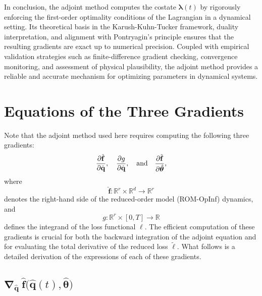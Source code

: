 In conclusion, the adjoint method computes the costate $\bm{\lambda}(t)$ by rigorously enforcing the first-order optimality conditions of the Lagrangian in a dynamical setting. Its theoretical basis in the Karush-Kuhn-Tucker framework, duality interpretation, and alignment with Pontryagin's principle ensures that the resulting gradients are exact up to numerical precision. Coupled with empirical validation strategies such as finite-difference gradient checking, convergence monitoring, and assessment of physical plausibility, the adjoint method provides a reliable and accurate mechanism for optimizing parameters in dynamical systems.


\section{Equations of the Three Gradients}
\label{sec:four_gradients}

Note that the adjoint method used here requires computing the following three gradients:\\
$$\pdv{\hat{\mathbf{f}}}{\hat{\mathbf{q}}},  \quad \pdv{g}{\hat{\mathbf{q}}}, \quad \text{and} \quad \pdv{\hat{\mathbf{f}}}{\hat{\bm{\theta}}},$$
where\\
$$\hat{\mathbf{f}}:\mathbb{R}^r \times \mathbb{R}^d \to \mathbb{R}^r$$ 
denotes the right-hand side of the reduced-order model (ROM-OpInf) dynamics, and\\
$$g:\mathbb{R}^r\times [0,T]\to \mathbb{R}$$ 
defines the integrand of the loss functional $\ell$. The efficient computation of these gradients is crucial for both the backward integration of the adjoint equation and for evaluating the total derivative of the reduced loss $\tilde\ell$. What follows is a detailed derivation of the expressions of each of these gradients.

\subsection{$\bm{\nabla}_{\hat{\mathbf{q}}}~\hat{\mathbf{f}}\bigl(\hat{\mathbf{q}}(t), \hat{\bm{\theta}}\bigr)$}


